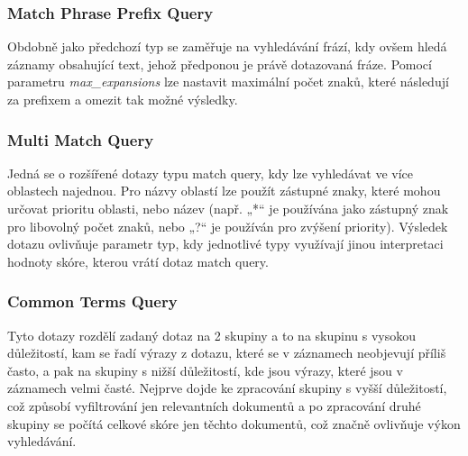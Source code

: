 \documentclass[czech,BP]{thesiskiv}
\begin{document}
\subsubsection{Match Phrase Prefix Query}
Obdobně jako předchozí typ se zaměřuje na vyhledávání frází, kdy ovšem hledá záznamy obsahující text, jehož předponou je právě dotazovaná fráze. Pomocí parametru \textit{max\_expansions} lze nastavit maximální počet znaků, které následují za prefixem a omezit tak možné výsledky.
\subsubsection{Multi Match Query}
Jedná se o rozšířené dotazy typu match query, kdy lze vyhledávat ve více oblastech najednou. Pro názvy oblastí lze použít zástupné znaky, které mohou určovat prioritu oblasti, nebo název (např. „*“ je používána jako zástupný znak pro libovolný počet znaků, nebo „?“ je používán pro zvýšení priority). Výsledek dotazu ovlivňuje parametr typ, kdy jednotlivé typy využívají jinou interpretaci hodnoty skóre, kterou vrátí dotaz match query.
\subsubsection{Common Terms Query}
Tyto dotazy rozdělí zadaný dotaz na 2 skupiny a to na skupinu s vysokou důležitostí, kam se řadí výrazy z dotazu, které se v záznamech neobjevují příliš často, a pak na skupiny s nižší důležitostí, kde jsou výrazy, které jsou v záznamech velmi časté. Nejprve dojde ke zpracování skupiny s vyšší důležitostí, což způsobí vyfiltrování jen relevantních dokumentů a po zpracování druhé skupiny se počítá celkové skóre jen těchto dokumentů, což značně ovlivňuje výkon vyhledávání.
\end{document}
